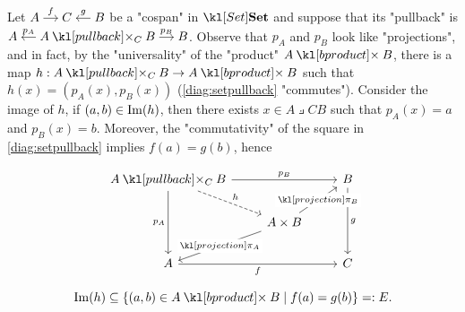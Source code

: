 \documentclass[main.tex]{subfiles}
\begin{document}
\begin{exmp}[$\catSet$]
    Let $\begin{tikzcd}[cramped, sep=small] A \arrow[r, "f"] & C & B \arrow[l, "g"'] \end{tikzcd}$ be a "cospan" in $\catSet$ and suppose that its "pullback" is $\begin{tikzcd}[cramped, sep=small] A & A \pullback{C} B \arrow[l, "p_A"'] \arrow[r, "p_B"]& B\end{tikzcd}$. Observe that $p_A$ and $p_B$ look like "projections", and in fact, by the "universality" of the "product" $A\product B$, there is a map $h: A\pullback{C} B \rightarrow A\product B$ such that $h(x) = (p_A(x), p_B(x))$ (\eqref{diag:setpullback} "commutes"). Consider the image of $h$, if $(a,b) \in \operatorname{Im}(h)$, then there exists $x \in A \pullback{C} B$ such that $p_A(x) = a$ and $p_B(x) = b$. Moreover, the "commutativity" of the square in \eqref{diag:setpullback} implies $f(a) = g(b)$, hence \begin{marginfigure}
    \begin{equation}\label{diag:setpullback} 
        \begin{tikzcd}
        {A\pullback{C} B} && B \\
        & {A\times B} \\
        A && C
        \arrow["{p_A}"', from=1-1, to=3-1]
        \arrow["f"', from=3-1, to=3-3]
        \arrow["{p_B}", from=1-1, to=1-3]
        \arrow["g", from=1-3, to=3-3]
        \arrow["h", dashed, from=1-1, to=2-2]
        \arrow["{\projection_A}"{description}, from=2-2, to=3-1]
        \arrow["{\projection_B}"{description}, from=2-2, to=1-3]
        \end{tikzcd}
    \end{equation}
    \end{marginfigure} \[\im(h) \subseteq \{(a,b) \in A\product B \mid f(a) = g(b)\} =: E.\]

\end{exmp}
\end{document}
